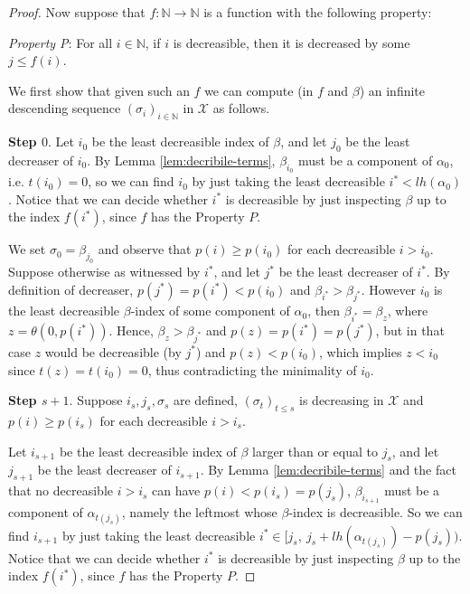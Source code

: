 \documentclass{amsart}
\newcommand\Nat{\mathbb{N}}
\begin{document}
\begin{proof}
Now suppose that $f:\Nat \to \Nat$ is a function with the following property:

\bigskip
{\em Property P}: For all $i\in \Nat$,
if $i$ is decreasible, then it is decreased by some $j \leq f(i)$. 

\bigskip
We first show that given such an $f$ we can compute (in $f$ and $\beta$) 
an infinite descending sequence $(\sigma_i)_{i\in\Nat}$ in $\mathcal{X}$ as follows. 

\medskip
{\bf Step $0$}.  
Let $i_0$ be the least decreasible index of $\beta$, and let $j_0$ be the least decreaser of $i_0$. By Lemma \ref{lem:decribile-terms}, $\beta_{i_0}$ must be a component of $\alpha_0$, i.e. $t(i_0) = 0$, so we can find $i_0$ by just taking the least decreasible $i^* < lh(\alpha_0)$. Notice that we can decide whether $i^*$ is decreasible by just inspecting $\beta$ up to the index $f(i^*)$, since $f$ has the Property $P$.

We set $\sigma_0 = \beta_{j_0}$ and observe that $p(i) \geq p(i_0)$ for each decreasible $i>i_0$. 
Suppose otherwise as witnessed by $i^*$, and let $j^*$ be the least decreaser of $i^*$. By definition of decreaser, $p(j^*) = p(i^*) < p(i_0)$ and $\beta_{i^*} > \beta_{j^*}$. However $i_0$ is the least decreasible $\beta$-index of some component of $\alpha_0$, then $\beta_{i^*} = \beta_z$, where $z = \theta(0,p(i^*))$. Hence, $\beta_z > \beta_{j^*}$ and $p(z)=p(i^*)=p(j^*)$, but in that case $z$ would be decreasible (by $j^*$) and $p(z) < p(i_0)$, which implies $z < i_0$ since $t(z)=t(i_0)=0$, thus contradicting the minimality of $i_0$.

\bigskip
{\bf Step $s+1$}. Suppose $i_s, j_s, \sigma_s$ are defined, $(\sigma_t)_{t \leq s}$ is decreasing in $\mathcal{X}$ and 
$p(i) \geq p(i_s)$ for each decreasible $i > i_s$. 

Let $i_{s+1}$ be the least decreasible index of $\beta$ larger than or equal to $j_s$, and let $j_{s+1}$ be the least decreaser of $i_{s+1}$. By Lemma \ref{lem:decribile-terms} and the fact that no decreasible $i > i_s$ can have $p(i) < p(i_s)=p(j_s)$, $\beta_{i_{s+1}}$ must be a component of $\alpha_{t(j_s)}$, namely the leftmost whose $\beta$-index is decreasible. So we can find $i_{s+1}$ 
by just taking the least decreasible $i^* \in [j_s,\ j_s + lh(\alpha_{t(j_s)}) - p(j_s))$. Notice that we can decide whether $i^*$ is decreasible by just inspecting $\beta$ up to the index $f(i^*)$, since $f$ has the Property $P$.


\end{proof}
\end{document}
